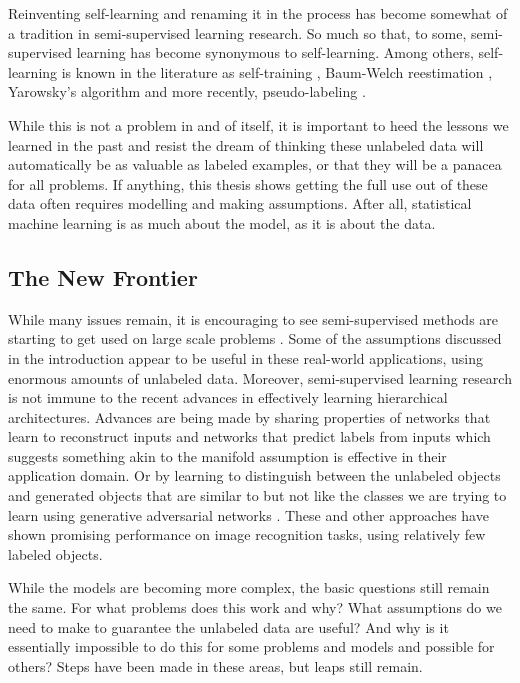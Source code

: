 \documentclass[twoside]{memoir}\usepackage[]{graphicx}\usepackage{xcolor}
\renewcommand{\cite}{\citep}
\begin{document}
Reinventing self-learning and renaming it in the process has become somewhat of a tradition in semi-supervised learning research. So much so that, to some, semi-supervised learning has become synonymous to self-learning. Among others, self-learning is known in the literature as self-training \citep{Zhu2005}, Baum-Welch reestimation \citep{Elworthy1994}, Yarowsky's algorithm and more recently, pseudo-labeling \cite{Lee2013}.

While this is not a problem in and of itself, it is important to heed the lessons we learned in the past and resist the dream of thinking these unlabeled data will automatically be as valuable as labeled examples, or that they will be a panacea for all problems. If anything, this thesis shows getting the full use out of these data often requires modelling and making assumptions. After all, statistical machine learning is as much about the model, as it is about the data.

\subsection{The New Frontier}
While many issues remain, it is encouraging to see semi-supervised methods  are starting to get used on large scale problems \cite{Ravi2016}. Some of the assumptions discussed in the introduction appear to be useful in these real-world applications, using enormous amounts of unlabeled data. Moreover, semi-supervised learning research is not immune to the recent advances in effectively learning hierarchical architectures. Advances are being made by sharing properties of networks that learn to reconstruct inputs and networks that predict labels from inputs \cite{Rasmus2015} which suggests something akin to the manifold assumption is effective in their application domain. Or by learning to distinguish between the unlabeled objects and generated objects that are similar to but not like the classes we are trying to learn using generative adversarial networks \cite{Salimans2016}. These and other approaches have shown promising performance on image recognition tasks, using relatively few labeled objects. 

While the models are becoming more complex, the basic questions still remain the same. For what problems does this work and why? What assumptions do we need to make to guarantee the unlabeled data are useful? And why is it essentially impossible to do this for some problems and models and possible for others? Steps have been made in these areas, but leaps still remain.
\end{document}
